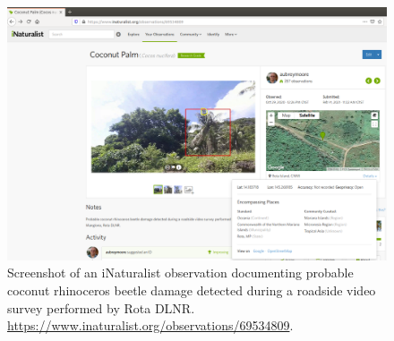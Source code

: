 \documentclass[12pt,letterpaper,english,bibliography=totocnumbered, abstract=on]{scrartcl}
\begin{document}
\begin{figure}[h]
	\centering
	\includegraphics[width=1\linewidth]{images/Rota-iNat-obs}
	\caption{Screenshot of an iNaturalist observation documenting probable coconut rhinoceros beetle damage detected during a roadside video survey performed by Rota DLNR. \url{https://www.inaturalist.org/observations/69534809}.}
	\label{fig:rota-inat-obs}
\end{figure}

\printbibliography
\end{document}
